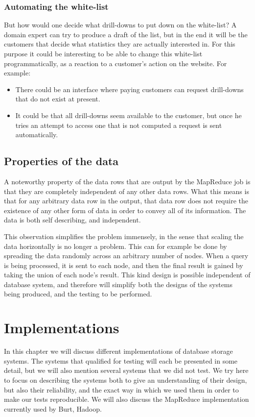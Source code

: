 \subsection{Automating the white-list}
But how would one decide what drill-downs to put down on the white-list? A domain expert can try to produce a draft of the list, but in the end it will be the customers that decide what statistics they are actually interested in. For this purpose it could be interesting to be able to change this white-list programmatically, as a reaction to a customer's action on the website. For example:
\begin{itemize}
\item There could be an interface where paying customers can request drill-downs that do not exist at present.
\item It could be that all drill-downs seem available to the customer, but once he tries an attempt to access one that is not computed a request is sent automatically.
\end{itemize}

\section{Properties of the data} \label{sec:Properties of the data}
A noteworthy property of the data rows that are output by the MapReduce job is that they are completely independent of any other data rows. What this means is that for any arbitrary data row in the output, that data row does not require the existence of any other form of data in order to convey all of its information. The data is both self describing, and independent.

This observation simplifies the problem immensely, in the sense that scaling the data horizontally is no longer a problem. This can for example be done by spreading the data randomly across an arbitrary number of nodes. When a query is being processed, it is sent to each node, and then the final result is gained by taking the union of each node's result. This kind design is possible independent of database system, and therefore will simplify both the designs of the systems being produced, and the testing to be performed.

\pagebreak
\chapter{Implementations}
In this chapter we will discuss different implementations of database storage systems. The systems that qualified for testing will each be presented in some detail, but we will also mention several systems that we did not test. We try here to focus on describing the systems both to give an understanding of their design, but also their reliability, and the exact way in which we used them in order to make our tests reproducible. We will also discuss the MapReduce implementation currently used by Burt, Hadoop.
